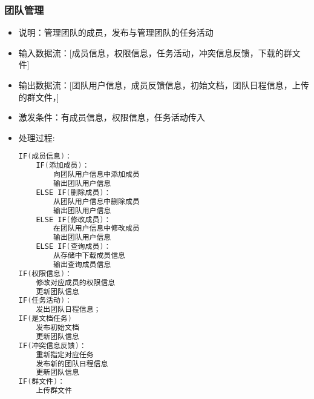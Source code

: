             \subsubsection{团队管理}
            \begin{itemize}
                \item 说明：管理团队的成员，发布与管理团队的任务活动
                \item 输入数据流：[成员信息，权限信息，任务活动，冲突信息反馈，下载的群文件]
                \item 输出数据流：[团队用户信息，成员反馈信息，初始文档，团队日程信息，上传的群文件，]
                \item 激发条件：有成员信息，权限信息，任务活动传入
                \item 处理过程:
\begin{lstlisting}[language=C, caption=团队管理, label={code:first-code}]
IF(成员信息)：
    IF(添加成员)：
        向团队用户信息中添加成员
        输出团队用户信息
    ELSE IF(删除成员)：
        从团队用户信息中删除成员
        输出团队用户信息
    ELSE IF(修改成员)：
        在团队用户信息中修改成员
        输出团队用户信息
    ELSE IF(查询成员)：
        从存储中下载成员信息
        输出查询成员信息
IF(权限信息)：
    修改对应成员的权限信息
    更新团队信息
IF(任务活动)：
    发出团队日程信息；
IF(是文档任务)
    发布初始文档
    更新团队信息
IF(冲突信息反馈)：
    重新指定对应任务
    发布新的团队日程信息
    更新团队信息
IF(群文件)：
    上传群文件
\end{lstlisting}
            \end{itemize}
